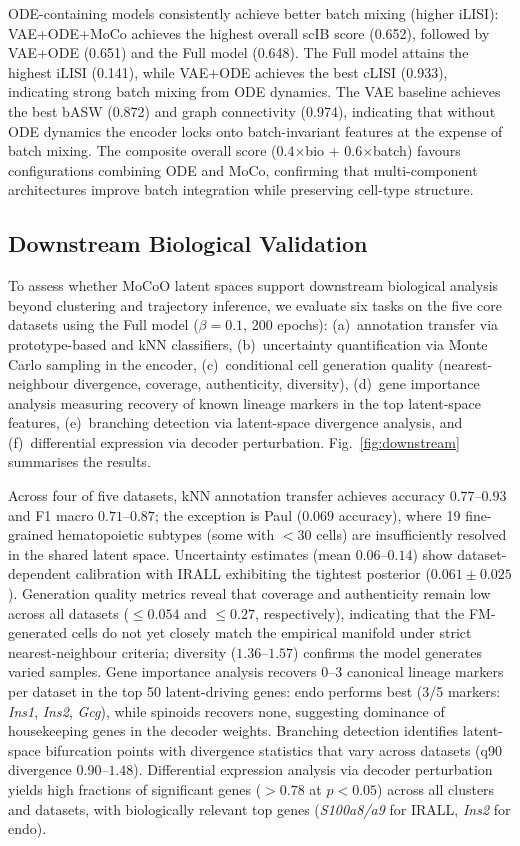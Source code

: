 \documentclass[preprint,12pt,number]{elsarticle}
\begin{document}
ODE-containing models consistently achieve better batch mixing (higher iLISI): VAE+ODE+MoCo achieves the highest overall scIB score (0.652), followed by VAE+ODE (0.651) and the Full model (0.648). The Full model attains the highest iLISI (0.141), while VAE+ODE achieves the best cLISI (0.933), indicating strong batch mixing from ODE dynamics. The VAE baseline achieves the best bASW (0.872) and graph connectivity (0.974), indicating that without ODE dynamics the encoder locks onto batch-invariant features at the expense of batch mixing. The composite overall score (0.4$\times$bio + 0.6$\times$batch) favours configurations combining ODE and MoCo, confirming that multi-component architectures improve batch integration while preserving cell-type structure.

\subsection{Downstream Biological Validation}
\label{sec:results:downstream}

To assess whether MoCoO latent spaces support downstream biological analysis beyond clustering and trajectory inference, we evaluate six tasks on the five core datasets using the Full model ($\beta{=}0.1$, 200 epochs): (a)~annotation transfer via prototype-based and kNN classifiers, (b)~uncertainty quantification via Monte Carlo sampling in the encoder, (c)~conditional cell generation quality (nearest-neighbour divergence, coverage, authenticity, diversity), (d)~gene importance analysis measuring recovery of known lineage markers in the top latent-space features, (e)~branching detection via latent-space divergence analysis, and (f)~differential expression via decoder perturbation. Fig.~\ref{fig:downstream} summarises the results.

Across four of five datasets, kNN annotation transfer achieves accuracy $0.77$--$0.93$ and F1 macro $0.71$--$0.87$; the exception is Paul ($0.069$ accuracy), where 19 fine-grained hematopoietic subtypes (some with $< 30$ cells) are insufficiently resolved in the shared latent space. Uncertainty estimates (mean $0.06$--$0.14$) show dataset-dependent calibration with IRALL exhibiting the tightest posterior ($0.061 \pm 0.025$). Generation quality metrics reveal that coverage and authenticity remain low across all datasets ($\leq 0.054$ and $\leq 0.27$, respectively), indicating that the FM-generated cells do not yet closely match the empirical manifold under strict nearest-neighbour criteria; diversity ($1.36$--$1.57$) confirms the model generates varied samples. Gene importance analysis recovers 0--3 canonical lineage markers per dataset in the top 50 latent-driving genes: endo performs best (3/5 markers: \textit{Ins1}, \textit{Ins2}, \textit{Gcg}), while spinoids recovers none, suggesting dominance of housekeeping genes in the decoder weights. Branching detection identifies latent-space bifurcation points with divergence statistics that vary across datasets (q90 divergence $0.90$--$1.48$). Differential expression analysis via decoder perturbation yields high fractions of significant genes ($> 0.78$ at $p < 0.05$) across all clusters and datasets, with biologically relevant top genes (\textit{S100a8/a9} for IRALL, \textit{Ins2} for endo).
\end{document}

